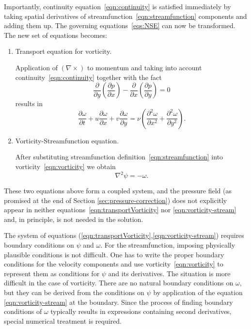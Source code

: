 \documentclass{article}
\begin{document}
	Importantly, continuity equation~\eqref{eqn:continuity} is satisfied immediately by taking spatial derivatives of streamfunction~\eqref{eqn:streamfunction} components and adding them up. The governing equations~\eqref{eqs:NSE} can now be transformed. The new set of equations becomes:
	\begin{enumerate}
		\item 
			Transport equation for vorticity.
			
			Application of $(\nabla \times)$ to momentum and taking into account continuity~\eqref{eqn:continuity} together with the fact
			\begin{equation*}
				\frac{\partial}{\partial y}\left(\frac{\partial p}{\partial x}\right) - 
				\frac{\partial}{\partial x}\left(\frac{\partial p}{\partial y}\right)=0
			\end{equation*}
			results in
			\begin{equation}
			\label{eqn:transportVorticity}
				\boxed{
				\frac{\partial\omega}{\partial t} 
				+ u \frac{\partial\omega}{\partial x} 
				+ v\frac{\partial\omega}{\partial y} 
				= \nu \left(\frac{\partial ^2 \omega}{\partial x^2} 
				+ \frac{\partial^2 \omega}{\partial y^2} \right).
				}
			\end{equation}
			
		\item 
		Vorticity-Streamfunction equation.
		
		After substituting streamfunction definition~\eqref{eqn:streamfunction} into vorticity~\eqref{eqn:vorticity} we obtain
		\begin{equation}
			\label{eqn:vorticity-stream}
			\boxed{\nabla ^2 \psi = -\omega.}
		\end{equation}	
	\end{enumerate}
	
	These two equations above form a coupled system, and the pressure field (as promised at the end of Section \ref{sec:pressure-correction}) does not explicitly appear in neither equations~\eqref{eqn:transportVorticity} nor \eqref{eqn:vorticity-stream} and, in principle, is not needed in the solution.
	
	The system of equations (\eqref{eqn:transportVorticity},\eqref{eqn:vorticity-stream}) requires boundary conditions on $\psi$ and $\omega$. For the streamfunction, imposing physically plausible conditions is not difficult. One has to write the proper boundary conditions for the velocity components and use vorticity~\eqref{eqn:vorticity} to represent them as conditions for $\psi$ and its derivatives. The situation is more difficult in the case of vorticity. There are no natural boundary conditions on $\omega$, but they can be derived from the conditions on $\psi$ by application of the equation \eqref{eqn:vorticity-stream} at the boundary. Since the process of finding boundary conditions of $\omega$ typically results in expressions containing second derivatives, special numerical treatment is required.
 
\end{document}
